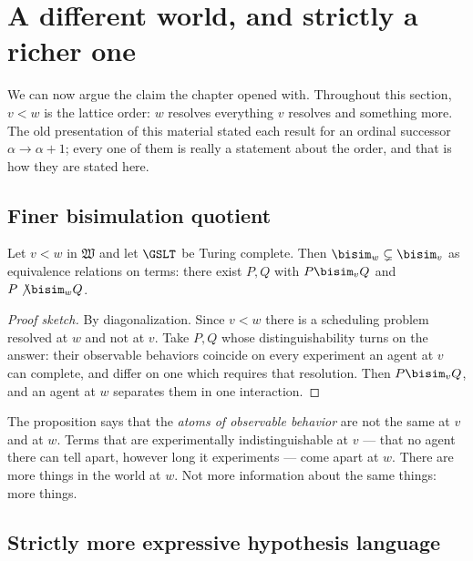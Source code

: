 \section{A different world, and strictly a richer one}
\label{sec:richer}

We can now argue the claim the chapter opened with.
Throughout this section, $v < w$ is the lattice order: $w$ resolves
everything $v$ resolves and something more.
The old presentation of this material stated each result for an ordinal
successor $\alpha \to \alpha+1$; every one of them is really a statement
about the order, and that is how they are stated here.

\subsection{Finer bisimulation quotient}

\begin{proposition}
\label{prop:strict-bisim}
Let $v < w$ in $\mathfrak{W}$ and let $\GSLT$ be Turing complete.
Then $\bisim_w \subsetneq \bisim_v$ as equivalence relations on terms:
there exist $P, Q$ with $P \bisim_v Q$ and $P \not\bisim_w Q$.
\end{proposition}

\begin{proof}[Proof sketch]
By diagonalization.
Since $v < w$ there is a scheduling problem resolved at $w$ and not at
$v$.
Take $P, Q$ whose distinguishability turns on the answer: their observable
behaviors coincide on every experiment an agent at $v$ can complete, and
differ on one which requires that resolution.
Then $P \bisim_v Q$, and an agent at $w$ separates them in one
interaction.
\end{proof}

\begin{remark}
The proposition says that the \emph{atoms of observable behavior} are not
the same at $v$ and at $w$.
Terms that are experimentally indistinguishable at $v$ --- that no agent
there can tell apart, however long it experiments --- come apart at $w$.
There are more things in the world at $w$.
Not more information about the same things: more things.
\end{remark}

\subsection{Strictly more expressive hypothesis language}

